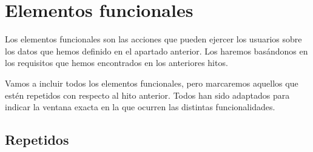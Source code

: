 \section{Elementos funcionales}

Los elementos funcionales son las acciones que pueden ejercer los usuarios
sobre los datos que hemos definido en el apartado anterior. Los haremos basándonos
en los requisitos que hemos encontrados en los anteriores hitos.

Vamos a incluir todos los elementos funcionales, pero marcaremos aquellos que estén
repetidos con respecto al hito anterior. Todos han sido adaptados para indicar la ventana exacta
en la que ocurren las distintas funcionalidades.

\subsection*{Repetidos}

